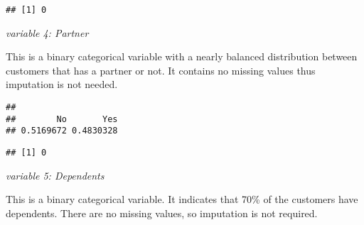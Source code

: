 \documentclass[
  a4paper]{article}
\newenvironment{Shaded}{\begin{snugshade}}{\end{snugshade}}
\newcommand{\CommentTok}[1]{\textcolor[rgb]{0.56,0.35,0.01}{\textit{#1}}}
\newcommand{\FunctionTok}[1]{\textcolor[rgb]{0.13,0.29,0.53}{\textbf{#1}}}
\newcommand{\NormalTok}[1]{#1}
\newcommand{\SpecialCharTok}[1]{\textcolor[rgb]{0.81,0.36,0.00}{\textbf{#1}}}
\begin{document}
\begin{Shaded}
\end{Shaded}

\begin{verbatim}
## [1] 0
\end{verbatim}

\emph{variable 4: Partner}

This is a binary categorical variable with a nearly balanced
distribution between customers that has a partner or not. It contains no
missing values thus imputation is not needed.

\begin{Shaded}
\end{Shaded}

\begin{verbatim}
## 
##        No       Yes 
## 0.5169672 0.4830328
\end{verbatim}

\begin{Shaded}
\end{Shaded}

\begin{verbatim}
## [1] 0
\end{verbatim}

\emph{variable 5: Dependents}

This is a binary categorical variable. It indicates that 70\% of the
customers have dependents. There are no missing values, so imputation is
not required.

\begin{Shaded}
\end{Shaded}
\end{document}
